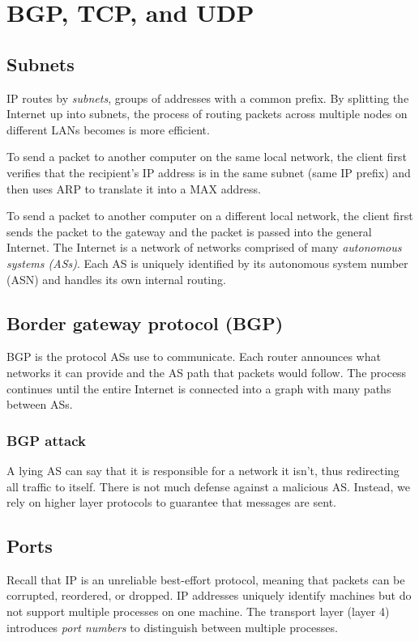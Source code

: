 \chapter{BGP, TCP, and UDP}

\section{Subnets}
IP routes by \emph{subnets}, groups of addresses with a common prefix. By splitting the Internet up into subnets, the process of routing packets across multiple nodes on different LANs becomes is more efficient. 

\medskip
To send a packet to another computer on the same local network, the client first verifies that the recipient's IP address is in the same subnet (same IP prefix) and then uses ARP to translate it into a MAX address.

\medskip
To send a packet to another computer on a different local network, the client first sends the packet to the gateway and the packet is passed into the general Internet. The Internet is a network of networks comprised of many \emph{autonomous systems (ASs)}. Each AS is uniquely identified by its autonomous system number (ASN) and handles its own internal routing.

\section{Border gateway protocol (BGP)}
BGP is the protocol ASs use to communicate. Each router announces what networks it can provide and the AS path that packets would follow. The process continues until the entire Internet is connected into a graph with many paths between ASs.

\subsection{BGP attack}
A lying AS can say that it is responsible for a network it isn't, thus redirecting all traffic to itself. There is not much defense against a malicious AS. Instead, we rely on higher layer protocols to guarantee that messages are sent.

\section{Ports}
Recall that IP is an unreliable best-effort protocol, meaning that packets can be corrupted, reordered, or dropped. IP addresses uniquely identify machines but do not support multiple processes on one machine. The transport layer (layer 4) introduces \emph{port numbers} to distinguish between multiple processes.

